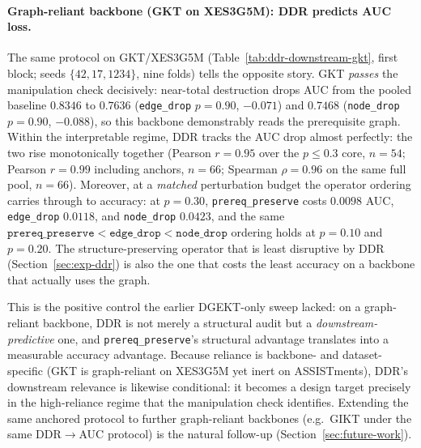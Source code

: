 \documentclass[pdflatex,sn-mathphys-num]{sn-jnl}
\newcommand{\DDR}{\textsc{DDR}}
\begin{document}
\paragraph{Graph-reliant backbone (GKT on XES3G5M): \DDR{} predicts AUC loss.}
The same protocol on GKT/XES3G5M (Table~\ref{tab:ddr-downstream-gkt}, first
block; seeds $\{42,17,1234\}$, nine folds) tells the opposite story. GKT \emph{passes} the
manipulation check decisively: near-total destruction drops AUC from the
pooled baseline $0.8346$ to $0.7636$ (\texttt{edge\_drop} $p{=}0.90$, ${-}0.071$) and
$0.7468$ (\texttt{node\_drop} $p{=}0.90$, ${-}0.088$), so this backbone
demonstrably reads the prerequisite graph. Within the interpretable regime,
\DDR{} tracks the AUC drop almost perfectly: the two rise monotonically together
(Pearson $r{=}0.95$ over the $p{\le}0.3$ core, $n{=}54$; Pearson $r{=}0.99$
including anchors, $n{=}66$; Spearman $\rho{=}0.96$ on the same full pool,
$n{=}66$). Moreover, at a \emph{matched} perturbation budget the
operator ordering carries through to accuracy: at $p{=}0.30$,
\texttt{prereq\_preserve} costs $0.0098$ AUC, \texttt{edge\_drop} $0.0118$, and
\texttt{node\_drop} $0.0423$, and the same
$\texttt{prereq\_preserve}<\texttt{edge\_drop}<\texttt{node\_drop}$ ordering
holds at $p{=}0.10$ and $p{=}0.20$. The structure-preserving operator that is
least disruptive by \DDR{} (Section~\ref{sec:exp-ddr}) is also the one that
costs the least accuracy on a backbone that actually uses the graph.

This is the positive control the earlier DGEKT-only sweep lacked: on a
graph-reliant backbone, \DDR{} is not merely a structural audit but a
\emph{downstream-predictive} one, and \texttt{prereq\_preserve}'s structural
advantage translates into a measurable accuracy advantage. Because reliance is
backbone- and dataset-specific (GKT is graph-reliant on XES3G5M yet inert on
ASSISTments), \DDR{}'s downstream relevance is likewise conditional: it becomes
a design target precisely in the high-reliance regime that the manipulation
check identifies. Extending the same anchored protocol to further graph-reliant
backbones (e.g.\ GIKT under the same \DDR{}$\to$AUC protocol) is the natural
follow-up (Section~\ref{sec:future-work}).
\end{document}
